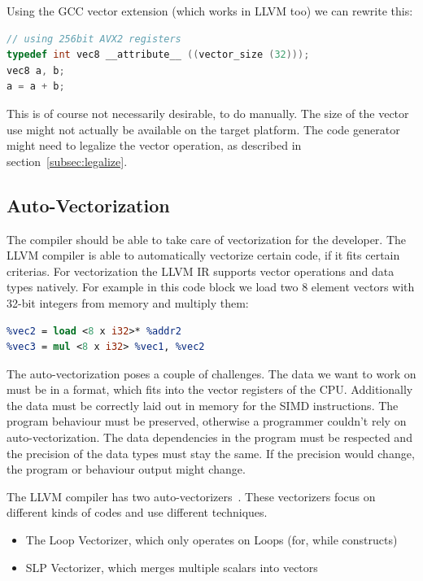 Using the GCC vector extension (which works in LLVM too) we can rewrite this:
\begin{lstlisting}[language=C,label={lst:vectorization}]
// using 256bit AVX2 registers
typedef int vec8 __attribute__ ((vector_size (32)));
vec8 a, b;
a = a + b;
\end{lstlisting}
This is of course not necessarily desirable, to do manually. The size of the vector use might not actually be
available on the target platform. The code generator might need to legalize the vector operation, as described in
section~\ref{subsec:legalize}.

\subsection{Auto-Vectorization}

The compiler should be able to take care of vectorization for the developer.
The LLVM compiler is able to automatically vectorize certain code, if it fits certain criterias.
For vectorization the LLVM IR supports vector operations and data types natively. For example in this code
block we load two 8 element vectors with 32-bit integers from memory and multiply them:
\begin{lstlisting}[language=LLVM]
%vec1 = load <8 x i32>* %addr1
%vec2 = load <8 x i32>* %addr2
%vec3 = mul <8 x i32> %vec1, %vec2
\end{lstlisting}

The auto-vectorization poses a couple of challenges.
The data we want to work on must be in a format, which fits into the vector registers of the CPU.
Additionally the data must be correctly laid out in memory for the SIMD instructions.
The program behaviour must be preserved, otherwise a programmer couldn't rely on auto-vectorization.
The data dependencies in the program must be respected and the precision of the data types must stay the same.
If the precision would change, the program or behaviour output might change.

The LLVM compiler has two auto-vectorizers~\cite{llvm:vectorization}. These vectorizers focus on different kinds of codes 
and use different techniques. 
\begin{itemize}
\item The Loop Vectorizer, which only operates on Loops (for, while constructs)
\item SLP Vectorizer, which merges multiple scalars into vectors
\end{itemize}

